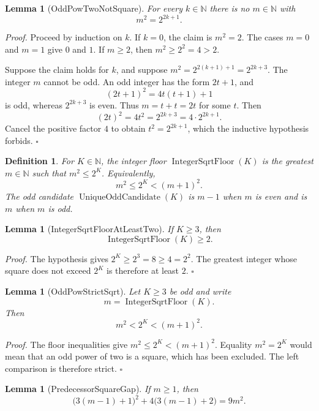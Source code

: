 \documentclass[11pt,letterpaper]{article}
\newcommand{\N}{\mathbb{N}}
\newtheorem{lemma}[theorem]{Lemma}
\newtheorem{definition}[theorem]{Definition}
\newenvironment{proof}{\noindent\textit{Proof.}}{\hfill\(\square\)}
\begin{document}
\begin{lemma}[OddPowTwoNotSquare]
For every \(k\in\N\) there is no \(m\in\N\) with
\[
m^2=2^{2k+1}.
\]
\end{lemma}

\begin{proof}
Proceed by induction on \(k\). If \(k=0\), the claim is \(m^2=2\). The cases
\(m=0\) and \(m=1\) give \(0\) and \(1\). If \(m\ge 2\), then
\(m^2\ge 2^2=4>2\).

Suppose the claim holds for \(k\), and suppose \(m^2=2^{2(k+1)+1}=2^{2k+3}\).
The integer \(m\) cannot be odd. An odd integer has the form \(2t+1\), and
\[
(2t+1)^2=4t(t+1)+1
\]
is odd, whereas \(2^{2k+3}\) is even. Thus \(m=t+t=2t\) for some \(t\). Then
\[
(2t)^2=4t^2=2^{2k+3}=4\cdot 2^{2k+1}.
\]
Cancel the positive factor \(4\) to obtain \(t^2=2^{2k+1}\), which the
inductive hypothesis forbids.
\end{proof}

\begin{definition}
For \(K\in\N\), the integer floor \(\operatorname{IntegerSqrtFloor}(K)\) is the
greatest \(m\in\N\) such that \(m^2\le 2^K\). Equivalently,
\[
m^2\le 2^K<(m+1)^2.
\]
The odd candidate \(\operatorname{UniqueOddCandidate}(K)\) is \(m-1\) when
\(m\) is even and is \(m\) when \(m\) is odd.
\end{definition}

\begin{lemma}[IntegerSqrtFloorAtLeastTwo]
If \(K\ge 3\), then
\[
\operatorname{IntegerSqrtFloor}(K)\ge 2.
\]
\end{lemma}

\begin{proof}
The hypothesis gives \(2^K\ge 2^3=8\ge 4=2^2\). The greatest integer whose
square does not exceed \(2^K\) is therefore at least \(2\).
\end{proof}

\begin{lemma}[OddPowStrictSqrt]
Let \(K\ge 3\) be odd and write
\[
m=\operatorname{IntegerSqrtFloor}(K).
\]
Then
\[
m^2<2^K<(m+1)^2.
\]
\end{lemma}

\begin{proof}
The floor inequalities give \(m^2\le 2^K<(m+1)^2\). Equality
\(m^2=2^K\) would mean that an odd power of two is a square, which has been
excluded. The left comparison is therefore strict.
\end{proof}

\begin{lemma}[PredecessorSquareGap]
If \(m\ge 1\), then
\[
\bigl(3(m-1)+1\bigr)^2+4\bigl(3(m-1)+2\bigr)=9m^2.
\]
\end{lemma}
\end{document}
